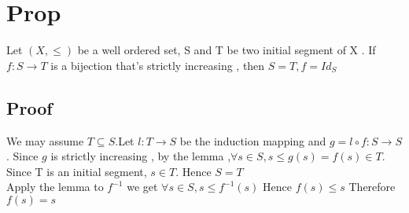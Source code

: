 \documentclass{book}
\begin{document}
\section{Prop}
Let $(X,\leq)$ be a well ordered set, S and T be two initial segment of X . If $f:S\rightarrow T$ is a bijection that's strictly increasing , then $S=T,f=Id_S$
\subsection{Proof}
We may assume $T\subseteq S$.Let $l:T\rightarrow S$ be the induction mapping and $g=l\circ f: S\rightarrow S$. Since $g$ is strictly increasing , by the lemma ,$ \forall s\in S,s\leq g(s)=f(s)\in T$. Since T is an initial segment, $s\in T.$ Hence $S=T$ \\Apply the lemma to $f^{-1}$ we get $\forall s\in S, s\leq f^{-1}(s)$ Hence $f(s)\leq s$ Therefore $f(s)=s$
\end{document}
